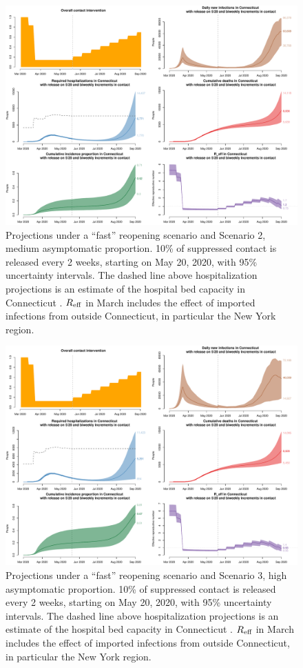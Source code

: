 \documentclass[11pt]{article}
\begin{document}
\begin{figure} %
	\centering
	\includegraphics[width=.9\textwidth]{figures/fast_medium_full.pdf}
	\caption{Projections under a ``fast'' reopening scenario and Scenario 2, medium asymptomatic proportion. 10\% of suppressed contact is released every 2 weeks, starting on May 20, 2020, with 95\% uncertainty intervals. The dashed line above hospitalization projections is an estimate of the hospital bed capacity in Connecticut \citep{CHAwebsite}. $R\textsubscript{eff}$ in March includes the effect of imported infections from outside Connecticut, in particular the New York region.}
	\label{fig:fast_medium}
\end{figure}

\begin{figure} %
	\centering
	\includegraphics[width=.9\textwidth]{figures/fast_high_full.pdf}
	\caption{Projections under a ``fast'' reopening scenario and Scenario 3, high asymptomatic proportion. 10\% of suppressed contact is released every 2 weeks, starting on May 20, 2020, with 95\% uncertainty intervals. The dashed line above hospitalization projections is an estimate of the hospital bed capacity in Connecticut \citep{CHAwebsite}. $R\textsubscript{eff}$ in March includes the effect of imported infections from outside Connecticut, in particular the New York region.}
	\label{fig:fast_high}
\end{figure}
\end{document}
